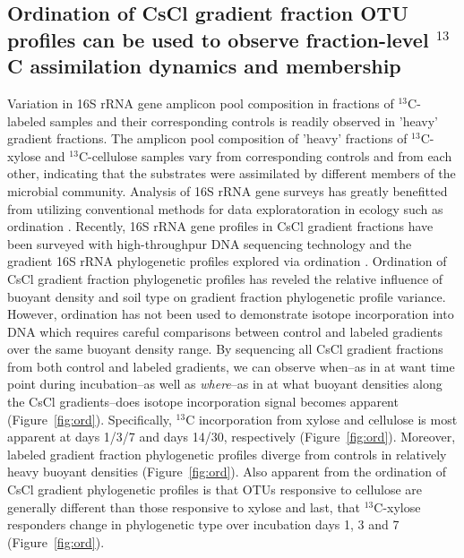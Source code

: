 \subsection{Ordination of CsCl gradient fraction OTU profiles can be used to
observe fraction-level $^{13}$C assimilation dynamics and membership}
Variation in 16S rRNA gene amplicon pool composition in fractions of
$^{13}$C-labeled samples and their corresponding controls is readily observed
in 'heavy' gradient fractions. The amplicon pool composition of 'heavy'
fractions of $^{13}$C-xylose and $^{13}$C-cellulose samples vary from
corresponding controls and from each other, indicating that the substrates were
assimilated by different members of the  microbial community.
Analysis of 16S rRNA gene surveys has greatly benefitted from utilizing
conventional methods for data exploratoration in ecology such as ordination \citep{Lozupone_2008}. 
Recently, 16S rRNA gene profiles in CsCl gradient fractions have been surveyed
with high-throughpur DNA sequencing technology and the gradient 16S rRNA 
phylogenetic profiles explored via ordination \citep{Angel_2013, Verastegui_2014}. Ordination of CsCl gradient fraction
phylogenetic profiles has reveled the relative influence of buoyant density and 
soil type on gradient fraction phylogenetic profile variance. However, ordination
has not been used to demonstrate isotope incorporation into DNA which requires careful
comparisons between control and labeled gradients over the same buoyant density range. By
sequencing all CsCl gradient fractions from both control and labeled gradients, we can 
observe when--as in at want time point during incubation--as well as \textit{where}--as in
at what buoyant densities along the CsCl gradients--does isotope incorporation signal 
becomes apparent (Figure~\ref{fig:ord}). Specifically, $^{13}$C incorporation from xylose
and cellulose is most apparent at days 1/3/7 and days 14/30, respectively 
(Figure~\ref{fig:ord}). Moreover, labeled gradient fraction phylogenetic profiles diverge 
from controls in relatively heavy buoyant densities (Figure~\ref{fig:ord}). Also apparent
from the ordination of CsCl gradient phylogenetic profiles is that OTUs responsive to 
cellulose are generally different than those responsive to xylose and last,
that $^{13}$C-xylose responders change in phylogenetic type over incubation
days 1, 3 and 7 (Figure~\ref{fig:ord}).

